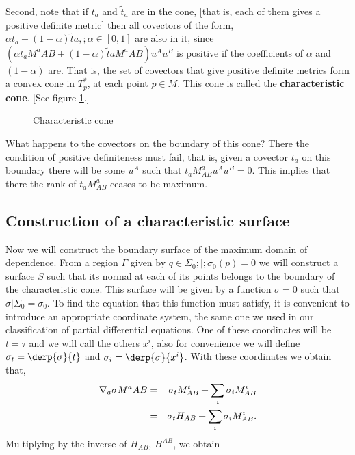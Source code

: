 Second, note that if $t_a$ and $\tilde{t}_a$ are in the cone, [that is, each of them gives a positive definite metric] then all covectors of the form, $\alpha t_a + (1-\alpha)\tilde{t}a, ;\alpha \in [0,1]$ are also in it, since $(\alpha t_aM^a{AB} + (1-\alpha)\tilde{t}aM^a{AB})u^A u^B$ is positive if the coefficients of $\alpha$ and $(1-\alpha)$ are. That is, the set of covectors that give positive definite metrics form a convex cone in $T_p^*$, at each point $p \in M$. This cone is called the {\bf characteristic cone}. 
[See figure \ref{fig:13_6b}.]

\espa %
\begin{figure}[htbp] 
    \begin{center} 
        \caption{Characteristic cone} 
        \label{fig:13_6b} 
    \end{center}
\end{figure}

What happens to the covectors on the boundary of this cone? There the condition of positive definiteness must fail, that is, given a covector $t_a$ on this boundary there will be some $u^A$ such that $t_aM^a_{AB}u^Au^B = 0$. This implies that there the rank of $t_aM^a_{AB}$ ceases to be maximum.

\subsection{Construction of a characteristic surface}

Now we will construct the boundary surface of the maximum domain of dependence. 
From a region $\Gamma$ given by ${ q \in \Sigma_0 ;|;\sigma_0(p) = 0}$ we will construct a surface $S$ 
such that its normal at each of its points belongs to the boundary of the characteristic cone. 
This surface will be given by a function $\sigma = 0$ such that $\sigma|{\Sigma_0} = \sigma_0$. 
To find the equation that this function must satisfy, it is convenient to introduce an appropriate coordinate system, 
the same one we used in our classification of partial differential equations. 
One of these coordinates will be $t = \tau$ and we will call the others $x^i$, also for convenience we will define 
$\sigma_t=\derp{\sigma}{t}$ and $\sigma_i=\derp{\sigma}{x^i}$. With these coordinates we obtain that, 
\begin{eqnarray} 
    \nabla_a\sigma M^a{AB} &=& \sigma_t M^t_{AB} + \sum_i \sigma_i M^i_{AB} \nonumber \\ 
    &=& \sigma_t H_{AB} + \sum_i \sigma_i M^i_{AB}. 
\end{eqnarray} 
Multiplying by the inverse of $H_{AB}$, $H^{AB}$, we obtain 


